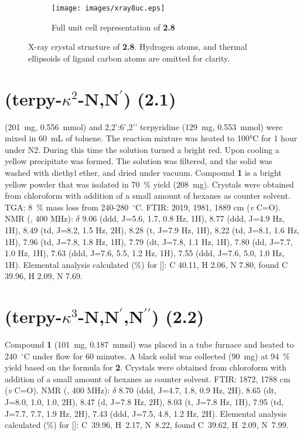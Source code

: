 \begin{figure}[!ht]
\begin{subfigure}[b]{0.49\textwidth}
 \end{subfigure}
 \begin{subfigure}[b]{\textwidth}
  \centering
  \texttt{[image: images/xray8uc.eps]}
  \caption{Full unit cell representation of \textbf{2.8}}
 \end{subfigure}
\caption[X-ray crystal structure of \textbf{2.8}]{X-ray crystal structure of \textbf{2.8}. Hydrogen atoms, and thermal ellipsoids of ligand carbon atoms are omitted for clarity.}
\label{fig.xray28}
\end{figure}

\section{(terpy-$\kappa^2$-N,N$^\prime$) (2.1)}\label{sec.c1}
 (201~mg,  0.556~mmol) and 2,2’:6’,2’’ terpyridine (129~mg, 0.553~mmol) were mixed in 60~mL of toluene. The reaction mixture was heated to 100°C for 1 hour under N2. During this time the solution turned a bright red. Upon cooling a yellow precipitate was formed. The solution was filtered, and the solid was washed with diethyl ether, and dried under vacuum. Compound \textbf{1} is a bright yellow powder that was isolated in 70~\% yield (208~mg). Crystals were obtained from chloroform with addition of a small amount of hexanes as counter solvent. TGA: 8~\% mass loss from 240-280~$^\circ$C.  FTIR: 2019, 1981, 1889 cm (\textit{v} C=O).  NMR (, 400 MHz): $\delta$ 9.06 (ddd, J=5.6, 1.7, 0.8 Hz, 1H), 8.77 (ddd, J=4.9 Hz, 1H), 8.49 (td, J=8.2, 1.5 Hz, 2H), 8.28 (t, J=7.9 Hz, 1H), 8.22 (td, J=8.1, 1.6 Hz, 1H), 7.96 (td, J=7.8, 1.8 Hz, 1H), 7.79 (dt, J=7.8, 1.1 Hz, 1H), 7.80 (dd, J=7.7, 1.0 Hz, 1H), 7.63 (ddd, J=7.6, 5.5, 1.2 Hz, 1H), 7.55 (ddd, J=7.6, 5.0, 1.0 Hz, 1H). Elemental analysis calculated (\%) for []: C 40.11, H 2.06, N 7.80, found C 39.96, H 2.09, N 7.69.

\section{(terpy-$\kappa^3$-N,N$^\prime$,N$^{\prime \prime}$) (2.2)}\label{sec.c2}
Compound \textbf{1} (101~mg, 0.187~mmol) was placed in a tube furnace and heated to 240~$^\circ$C under  flow for 60 minutes. A black solid was collected (90~mg) at 94~\% yield based on the formula for \textbf{2}. Crystals were obtained from chloroform with addition of a small amount of hexanes as counter solvent. FTIR: 1872, 1788 cm (\textit{v} C=O).  NMR (, 400 MHz): $\delta$ 8.70 (ddd, J=4.7, 1.8, 0.9 Hz, 2H), 8.65 (dt, J=8.0, 1.0, 1.0, 2H), 8.47 (d, J=7.8 Hz, 2H), 8.03 (t, J=7.8 Hz, 1H), 7.95 (td, J=7.7, 7.7, 1.9 Hz, 2H), 7.43 (ddd, J=7.5, 4.8, 1.2 Hz, 2H). Elemental analysis calculated (\%) for []: C~39.96, H~2.17, N~8.22, found C~39.62, H~2.09, N~7.99.

